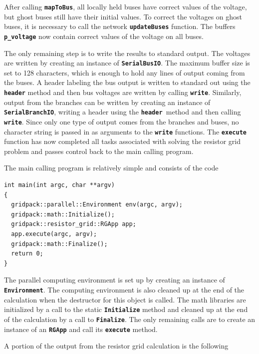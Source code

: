 After calling \texttt{\textbf{mapToBus}}, all locally held buses have correct values of the voltage, but ghost buses still have their initial values. To correct the voltages on ghost buses, it is necessary to call the network \texttt{\textbf{updateBuses}} function. The buffers \texttt{\textbf{p\_voltage}} now contain correct values of the voltage on all buses.

The only remaining step is to write the results to standard output. The voltages are written by creating an instance of \texttt{\textbf{SerialBusIO}}. The maximum buffer size is set to 128 characters, which is enough to hold any lines of output coming from the buses. A header labeling the bus output is written to standard out using the \texttt{\textbf{header}} method and then bus voltages are written by calling \texttt{\textbf{write}}. Similarly, output from the branches can be written by creating an instance of \texttt{\textbf{SerialBranchIO}}, writing a header using the \texttt{\textbf{header }}method and then calling \texttt{\textbf{write}}. Since only one type of output comes from the branches and buses, no character string is passed in as arguments to the \texttt{\textbf{write}} functions. The \texttt{\textbf{execute}} function has now completed all tasks associated with solving the resistor grid problem and passes control back to the main calling program.

The main calling program is relatively simple and consists of the code

{
\color{red}
\begin{Verbatim}[fontseries=b]
int main(int argc, char **argv)
{
  gridpack::parallel::Environment env(argc, argv);
  gridpack::math::Initialize();
  gridpack::resistor_grid::RGApp app;
  app.execute(argc, argv);
  gridpack::math::Finalize();
  return 0;
}
\end{Verbatim}
}

The parallel computing environment is set up by creating an instance of \texttt{\textbf{Environment}}. The computing environment is also cleaned up at the end of the calculation when the destructor for this object is called. The math libraries are initialized by a call to the static \texttt{\textbf{Initialize}} method and cleaned up at the end of the calculation by a call to \texttt{\textbf{Finalize}}. The only remaining calls are to create an instance of an \texttt{\textbf{RGApp}} and call its \texttt{\textbf{execute}} method.

A portion of the output from the resistor grid calculation is the following

